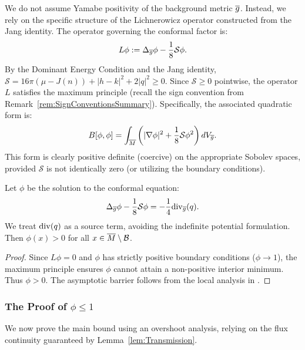 \begin{theorem}\label{thm:PositivityPhi}
We do not assume Yamabe positivity of the background metric $\overline{g}$. Instead, we rely on the specific structure of the Lichnerowicz operator constructed from the Jang identity.
The operator governing the conformal factor is:
\[ L \phi := \Delta_{\overline{g}} \phi - \frac{1}{8}\mathcal{S} \phi. \]
By the Dominant Energy Condition and the Jang identity, $\mathcal{S} = 16\pi(\mu-J(n)) + |h-k|^2 + 2|q|^2 \ge 0$.
Since $\mathcal{S} \ge 0$ pointwise, the operator $L$ satisfies the maximum principle (recall the sign convention from Remark~\ref{rem:SignConventionsSummary}). Specifically, the associated quadratic form is:
\[ B[\phi, \phi] = \int_{\overline{M}} \left( |\nabla \phi|^2 + \frac{1}{8}\mathcal{S}\phi^2 \right) dV_{\overline{g}}. \]
This form is clearly positive definite (coercive) on the appropriate Sobolev spaces, provided $\mathcal{S}$ is not identically zero (or utilizing the boundary conditions).

Let $\phi$ be the solution to the conformal equation:
\begin{equation}\label{eq:conformal_pde}
    \Delta_{\overline{g}} \phi - \frac{1}{8} \mathcal{S} \phi = - \frac{1}{4} \mathrm{div}_{\overline{g}}(q).
\end{equation}
We treat $\mathrm{div}(q)$ as a source term, avoiding the indefinite potential formulation.
Then $\phi(x) > 0$ for all $x \in \overline{M} \setminus \mathcal{B}$.
\end{theorem}
\begin{proof}
Since $L\phi=0$ and $\phi$ has strictly positive boundary conditions ($\phi\to 1$), the maximum principle ensures $\phi$ cannot attain a non-positive interior minimum. Thus $\phi > 0$. The asymptotic barrier follows from the local analysis in .
\end{proof}

\subsubsection{The Proof of $\phi \le 1$}
We now prove the main bound using an overshoot analysis, relying on the flux continuity guaranteed by Lemma~\ref{lem:Transmission}.

